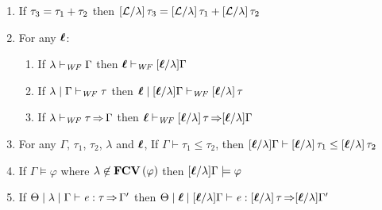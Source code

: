 
\def\subref#1#2{\Cref{#1} (part \labelcref{#2})}

\begin{lemma}\label{lem:ctxt-substitution}
  \leavevmode
  \begin{enumerate}
  \item \label{itm:ctxt-sub-distribute} If $\tau_{{\mathrm{3}}}  =  \tau_{{\mathrm{1}}}  +  \tau_{{\mathrm{2}}}$ then $[  \mathcal{L}  /  \lambda  ] \, \tau_{{\mathrm{3}}}  =  [  \mathcal{L}  /  \lambda  ] \, \tau_{{\mathrm{1}}}  +  [  \mathcal{L}  /  \lambda  ] \, \tau_{{\mathrm{2}}}$
  \item \label{itm:ctxt-sub-wf}For any $\oldvec{\ell}$:
    \begin{enumerate}
    \item If $ \lambda   \vdash _{\mathit{WF}}  \Gamma $ then $ \oldvec{\ell}   \vdash _{\wf}  \ottsym{[}  \oldvec{\ell}  \ottsym{/}  \lambda  \ottsym{]}  \Gamma $
    \item If $ \lambda   \mid   \Gamma   \vdash _{\mathit{WF}}  \tau $ then $ \oldvec{\ell}   \mid   \ottsym{[}  \oldvec{\ell}  \ottsym{/}  \lambda  \ottsym{]}  \Gamma   \vdash _{\wf}  \ottsym{[}  \oldvec{\ell}  \ottsym{/}  \lambda  \ottsym{]} \, \tau $
    \item If $ \lambda   \vdash _{\mathit{WF}}  \tau   \operatorname{\Rightarrow}   \Gamma $ then $ \oldvec{\ell}   \vdash _{\wf}  \ottsym{[}  \oldvec{\ell}  \ottsym{/}  \lambda  \ottsym{]} \, \tau   \produces   \ottsym{[}  \oldvec{\ell}  \ottsym{/}  \lambda  \ottsym{]}  \Gamma $
    \end{enumerate}
  \item \label{itm:ctxt-sub-subtype} For any $\Gamma$, $\tau_{{\mathrm{1}}}$, $\tau_{{\mathrm{2}}}$, $\lambda$ and $\oldvec{\ell}$, If $\Gamma  \vdash  \tau_{{\mathrm{1}}}  \leq  \tau_{{\mathrm{2}}}$, then $\ottsym{[}  \oldvec{\ell}  \ottsym{/}  \lambda  \ottsym{]}  \Gamma  \vdash  \ottsym{[}  \oldvec{\ell}  \ottsym{/}  \lambda  \ottsym{]} \, \tau_{{\mathrm{1}}}  \leq  \ottsym{[}  \oldvec{\ell}  \ottsym{/}  \lambda  \ottsym{]} \, \tau_{{\mathrm{2}}}$
  \item \label{itm:ctxt-subst-assert} If $\Gamma  \models  \varphi$ where $ \lambda  \not\in  \mathbf{FCV} \, (  \varphi  ) $ then $\ottsym{[}  \oldvec{\ell}  \ottsym{/}  \lambda  \ottsym{]}  \Gamma  \models  \varphi$
  \item \label{itm:ctxt-subst-well-typed} If $ \Theta   \mid   \lambda   \mid   \Gamma   \vdash   \mathit{e}  :  \tau   \operatorname{\Rightarrow}   \Gamma' $ then $ \Theta   \mid   \oldvec{\ell}   \mid   \ottsym{[}  \oldvec{\ell}  \ottsym{/}  \lambda  \ottsym{]}  \Gamma   \vdash   \ottnt{e}  :  \ottsym{[}  \oldvec{\ell}  \ottsym{/}  \lambda  \ottsym{]} \, \tau   \produces   \ottsym{[}  \oldvec{\ell}  \ottsym{/}  \lambda  \ottsym{]}  \Gamma' $
  \end{enumerate}
\end{lemma}
